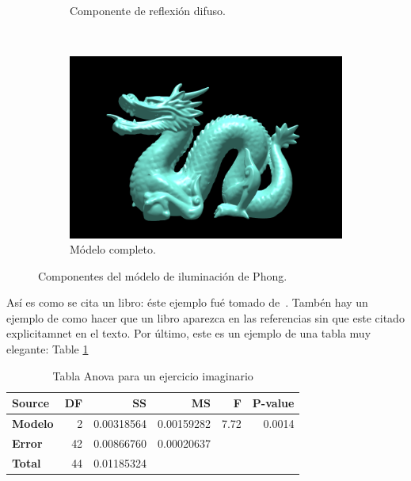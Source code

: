 \begin{figure}[htp]
\begin{subfigure}[b]{0.45\textwidth}
   \caption{Componente de reflexión difuso.}
   \label{fig:2c}
 \end{subfigure}
~
 \begin{subfigure}[b]{0.45\textwidth}
   \includegraphics[width=\textwidth]{img/cap02/completo}
   \caption{Módelo completo.}
   \label{fig:2d}
 \end{subfigure}
 \caption[Módelo de iluminación de Phong]{Componentes del módelo de iluminación de Phong.}
 \label{fig:two}
\end{figure}

Así es como se cita un libro: éste ejemplo fué tomado de~\cite{Gonzalez:ImagenesDigitales}. 
Tambén hay un ejemplo de como hacer que un libro aparezca en las referencias sin que este citado explicitamnet en el texto. 
Por último, este es un ejemplo de una tabla muy elegante: Table \ref{tab:exey}

\begin{table}[htb]
  \begin{center}
    \begin{tabular}{l | r r r r r}
      \toprule
      Source & \textbf{DF} & \textbf{SS} & \textbf{MS} & \textbf{F} & \textbf{P-value} \\
      \midrule
      \textbf{Modelo} & 2 & 0.00318564 & 0.00159282 & 7.72 & 0.0014 \\
      \textbf{Error} & 42 & 0.00866760 & 0.00020637 &  & \\
      \midrule
      \textbf{Total} & 44 & 0.01185324 &   &  & \\
      \bottomrule
    \end{tabular}
  \end{center}
\caption{Tabla Anova para un ejercicio imaginario}
\label{tab:exey}
\end{table}
